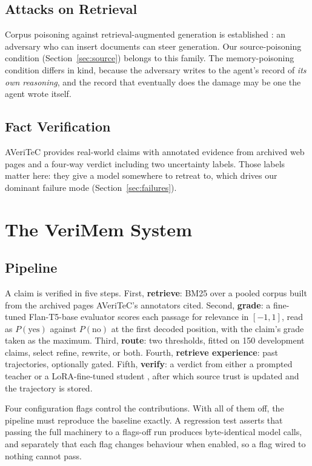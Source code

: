 \documentclass[journal]{IEEEtran}
\begin{document}
\subsection{Attacks on Retrieval}
Corpus poisoning against retrieval-augmented generation is established
\cite{zou2024poisonedrag, zhong2023poisoning}: an adversary who can insert
documents can steer generation. Our source-poisoning condition
(Section~\ref{sec:source}) belongs to this family. The memory-poisoning
condition differs in kind, because the adversary writes to the agent's record of
\emph{its own reasoning}, and the record that eventually does the damage may be
one the agent wrote itself.

\subsection{Fact Verification}
AVeriTeC \cite{schlichtkrull2023averitec} provides real-world claims with
annotated evidence from archived web pages and a four-way verdict including two
uncertainty labels. Those labels matter here: they give a model somewhere to
retreat to, which drives our dominant failure mode (Section~\ref{sec:failures}).

\section{The VeriMem System}

\subsection{Pipeline}
A claim is verified in five steps. First, \textbf{retrieve}: BM25
\cite{robertson2009bm25} over a pooled corpus built from the archived pages
AVeriTeC's annotators cited. Second, \textbf{grade}: a fine-tuned Flan-T5-base
evaluator \cite{chung2022flant5} scores each passage for relevance in
$[-1,1]$, read as $P(\text{yes})$ against $P(\text{no})$ at the first decoded
position, with the claim's grade taken as the maximum. Third, \textbf{route}:
two thresholds, fitted on 150 development claims, select refine, rewrite, or
both. Fourth, \textbf{retrieve experience}: past trajectories, optionally gated.
Fifth, \textbf{verify}: a verdict from either a prompted teacher or a
LoRA-fine-tuned student \cite{hu2021lora, dettmers2023qlora}, after which source
trust is updated and the trajectory is stored.

Four configuration flags control the contributions. With all of them off, the
pipeline must reproduce the baseline exactly. A regression test asserts that
passing the full machinery to a flags-off run produces byte-identical model
calls, and separately that each flag changes behaviour when enabled, so a flag
wired to nothing cannot pass.
\end{document}
